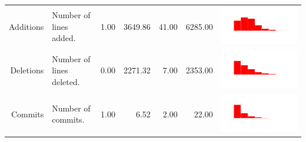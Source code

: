 \documentclass[conference]{IEEEtran}
\begin{document}
\begin{table}[ht]
\begin{tabular}{rp{26em}rrrrc}
    Additions & Number of lines added. & 1.00 & 3649.86 & 41.00 & 6285.00 & \includegraphics[scale = 0.1, clip = true, trim= 50px 60px 50px 60px]{../figs/hist-features/hist-additions.pdf} \\
    Deletions & Number of lines deleted. & 0.00 & 2271.32 & 7.00 & 2353.00 & \includegraphics[scale = 0.1, clip = true, trim= 50px 60px 50px 60px]{../figs/hist-features/hist-deletions.pdf} \\
    Commits & Number of commits. & 1.00 & 6.52 & 2.00 & 22.00 & \includegraphics[scale = 0.1, clip = true, trim= 50px 60px 50px 60px]{../figs/hist-features/hist-commits.pdf} \\

\end{tabular}
\end{table}
\end{document}
